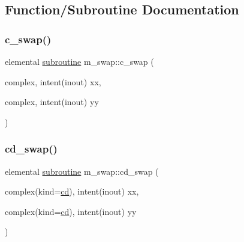 \subsection{Function/\+Subroutine Documentation}
\mbox{\label{namespacem__swap_a2353a772e3ac1242164631a9ec75f981}} 
\subsubsection{\texorpdfstring{c\+\_\+swap()}{c\_swap()}}
{\footnotesize\ttfamily elemental \hyperlink{M__stopwatch_83_8txt_acfbcff50169d691ff02d4a123ed70482}{subroutine} m\+\_\+swap\+::c\+\_\+swap (\begin{DoxyParamCaption}\item[{complex, intent(inout)}]{xx,  }\item[{complex, intent(inout)}]{yy }\end{DoxyParamCaption})\hspace{0.3cm}{\ttfamily [private]}}

\mbox{\label{namespacem__swap_a7961e38856c3c44276520f6543b609b7}} 
\subsubsection{\texorpdfstring{cd\+\_\+swap()}{cd\_swap()}}
{\footnotesize\ttfamily elemental \hyperlink{M__stopwatch_83_8txt_acfbcff50169d691ff02d4a123ed70482}{subroutine} m\+\_\+swap\+::cd\+\_\+swap (\begin{DoxyParamCaption}\item[{complex(kind=\hyperlink{namespacem__swap_af14229bde3625fba5d65e401fd16c3d1}{cd}), intent(inout)}]{xx,  }\item[{complex(kind=\hyperlink{namespacem__swap_af14229bde3625fba5d65e401fd16c3d1}{cd}), intent(inout)}]{yy }\end{DoxyParamCaption})\hspace{0.3cm}{\ttfamily [private]}}

\mbox{\label{namespacem__swap_a73a5ecd37d14f30520e204bb906734c0}} 
